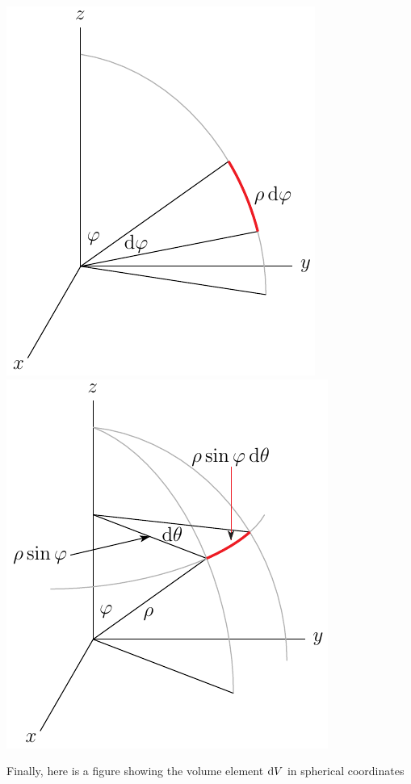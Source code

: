 \begin{wfig}
\begin{center}
    \includegraphics{spher9.pdf}\qquad
    \includegraphics{spher10.pdf}
\end{center}
\end{wfig}
Finally, here is a figure showing the volume element $\mathrm{d}V$ in
spherical coordinates
